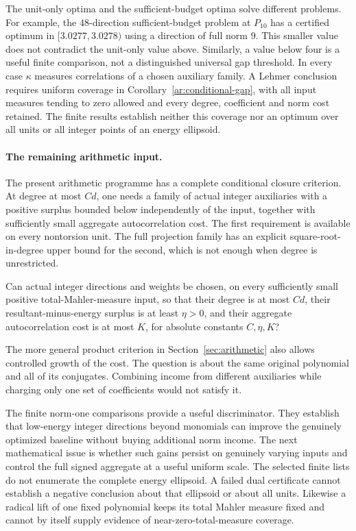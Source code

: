 \begin{remark}\label{ar:finite-boundary}
The unit-only optima and the sufficient-budget optima solve different problems.
For example, the $48$-direction sufficient-budget problem at $P_{10}$ has a certified optimum in $[3.0277,3.0278)$ using a direction of full norm $9$.
This smaller value does not contradict the unit-only value above.
Similarly, a value below four is a useful finite comparison, not a distinguished universal gap threshold.
In every case $\kappa$ measures correlations of a chosen auxiliary family.
A Lehmer conclusion requires uniform coverage in Corollary~\ref{ar:conditional-gap}, with all input measures tending to zero allowed and every degree, coefficient and norm cost retained.
The finite results establish neither this coverage nor an optimum over all units or all integer points of an energy ellipsoid.
\end{remark}

\paragraph{The remaining arithmetic input.}
The present arithmetic programme has a complete conditional closure criterion.
At degree at most $Cd$, one needs a family of actual integer auxiliaries with a positive surplus bounded below independently of the input, together with sufficiently small aggregate autocorrelation cost.
The first requirement is available on every nontorsion unit.
The full projection family has an explicit square-root-in-degree upper bound for the second, which is not enough when degree is unrestricted.

\begin{question}\label{out:coherence}
Can actual integer directions and weights be chosen, on every sufficiently small positive total-Mahler-measure input, so that their degree is at most $Cd$, their resultant-minus-energy surplus is at least $\eta>0$, and their aggregate autocorrelation cost is at most $K$, for absolute constants $C,\eta,K$?
\end{question}
The more general product criterion in Section~\ref{sec:arithmetic} also allows controlled growth of the cost.
The question is about the same original polynomial and all of its conjugates.
Combining income from different auxiliaries while charging only one set of coefficients would not satisfy it.

The finite norm-one comparisons provide a useful discriminator.
They establish that low-energy integer directions beyond monomials can improve the genuinely optimized baseline without buying additional norm income.
The next mathematical issue is whether such gains persist on genuinely varying inputs and control the full signed aggregate at a useful uniform scale.
The selected finite lists do not enumerate the complete energy ellipsoid.
A failed dual certificate cannot establish a negative conclusion about that ellipsoid or about all units.
Likewise a radical lift of one fixed polynomial keeps its total Mahler measure fixed and cannot by itself supply evidence of near-zero-total-measure coverage.

